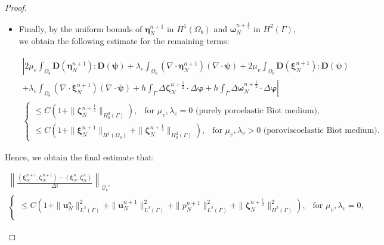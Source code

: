 \documentclass[11pt]{article}
\newcommand{\bd}{\boldsymbol}
\theoremstyle{definition}
\begin{document}
\begin{proof}
\begin{itemize}
\begin{equation*}
\left|\alpha \int_{\Omega_{b}} \mathcal{J}^{(\eta^{n}_{N})^{\delta}}_{b} p^{n + 1}_{N} \nabla^{(\eta^{n}_{N})^{\delta}}_{b} \cdot \bd{\psi}^{\delta}\right| \le C, \qquad \text{ independently of $n$ and $N$}.
\end{equation*}
\item Finally, by the uniform bounds of $\bd{\eta}^{n + 1}_{N}$ in $H^{1}(\Omega_{b})$ and $\bd{\omega}^{n + \frac{1}{2}}_{N}$ in $H^{2}(\Gamma)$, we obtain the following estimate for the remaining terms:
\begin{small}
\begin{multline*}
\left|2\mu_{e} \int_{\Omega_{b}} \bd{D}(\bd{\eta}^{n + 1}_{N}) : \bd{D}(\bd{\psi}) + \lambda_{e} \int_{\Omega_{b}} (\nabla \cdot \bd{\eta}^{n + 1}_{N}) (\nabla \cdot \bd{\psi}) + 2\mu_{v} \int_{\Omega_{b}} \bd{D}(\bd{\xi}^{n + 1}_{N}) : \bd{D}(\bd{\psi}) \right. \\
\left. + \lambda_{v} \int_{\Omega_{b}} (\nabla \cdot \bd{\xi}^{n + 1}_{N}) (\nabla \cdot \bd{\psi}) + h \int_{\Gamma} \Delta \bd{\zeta}^{n + \frac{1}{2}}_{N} \cdot \Delta \bd{\varphi} + h \int_{\Gamma} \Delta \bd{\omega}^{n + \frac{1}{2}}_{N} \cdot \Delta \bd{\varphi}\right| \\
\begin{cases}
\le C\left(1 + \|\bd{\zeta}^{n + \frac{1}{2}}_{N}\|_{H^{2}_{0}(\Gamma)}\right), \ \ \text{ for $\mu_{v}, \lambda_{v} = 0$ (purely poroelastic Biot medium)}, \\
\le C\left(1 + \|\bd{\xi}^{n + 1}_{N}\|_{H^{1}(\Omega_{b})} + \|\bd{\zeta}^{n + \frac{1}{2}}_{N}\|_{H^{2}_{0}(\Gamma)}\right), \ \ \text{ for $\mu_{v}, \lambda_{v} > 0$ (poroviscoelastic Biot medium)}.
\end{cases}
\end{multline*}
\end{small}
\end{itemize}
Hence, we obtain the final estimate that:
\begin{small}
\begin{multline*}
\left\|\frac{(\bd{\xi}^{n + 1}_{N}, \bd{\zeta}^{n + 1}_{N}) - (\bd{\xi}^{n}_{N}, \bd{\zeta}^{n}_{N})}{\Delta t}\right\|_{\mathcal{Q}_{v}'} \\
\begin{cases}
\le C\left(1 + \|\bd{u}^{n}_{N}\|^{2}_{L^{2}(\Gamma)} + \|\bd{u}^{n + 1}_{N}\|_{L^{2}(\Gamma)}^{2} + \|p^{n + 1}_{N}\|_{L^{2}(\Gamma)}^{2} + \|\bd{\zeta}^{n + \frac{1}{2}}_{N}\|_{H^{2}(\Gamma)}^{2}\right), \ \ \text{ for $\mu_{v}, \lambda_{v} = 0$}, \\

\end{cases}
\end{multline*}
\end{small}
\end{proof}
\end{document}
